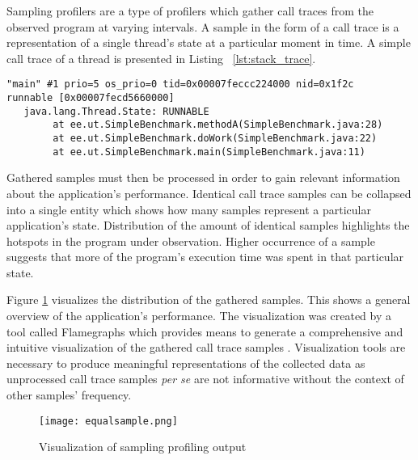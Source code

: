 \documentclass[..thesis.tex]{subfiles}
\begin{document}
Sampling profilers are a type of profilers which gather call traces from the observed program at varying intervals. A sample in the form of a call trace is a representation of a single thread's state at a particular moment in time. A simple call trace of a thread is presented in Listing ~\ref{lst:stack_trace}. 

\begin{lstlisting}[style=def,label={lst:stack_trace}, caption={Call trace of a thread}]
"main" #1 prio=5 os_prio=0 tid=0x00007feccc224000 nid=0x1f2c 
runnable [0x00007fecd5660000]
   java.lang.Thread.State: RUNNABLE
	    at ee.ut.SimpleBenchmark.methodA(SimpleBenchmark.java:28)
    	at ee.ut.SimpleBenchmark.doWork(SimpleBenchmark.java:22)
	    at ee.ut.SimpleBenchmark.main(SimpleBenchmark.java:11)
\end{lstlisting}


Gathered samples must then be processed in order to gain relevant information about the application's performance. Identical call trace samples can be collapsed into a single entity which shows how many samples represent a particular application's state.
Distribution of the amount of identical samples highlights the hotspots in the program under observation. Higher occurrence of a sample suggests that more of the program's execution time was spent in that particular state. 

Figure \ref{fig:samplingProf} visualizes the distribution of the gathered samples. This shows a general overview of the application's performance. The visualization was created by a tool called Flamegraphs which provides means to generate a comprehensive and intuitive visualization of the gathered call trace samples \cite{gregg_flame}. Visualization tools are necessary to produce meaningful representations of the collected data as unprocessed call trace samples \textit{per se} are not informative without the context of other samples' frequency.

\begin{figure}[H]
\texttt{[image: equalsample.png]}
\caption{Visualization of sampling profiling output}
\label{fig:samplingProf}
\end{figure}
\end{document}
